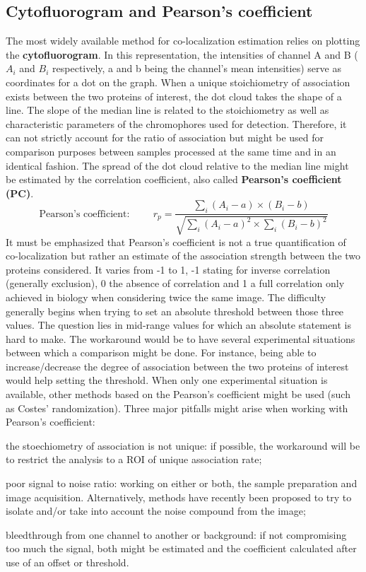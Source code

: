 \documentclass[]{spie}  %
\begin{document}
\subsection{Cytofluorogram and Pearson's coefficient}
\label{sec:MM_cyto}
The most widely available method for co-localization estimation relies on plotting the \textbf{cytofluorogram}. In this representation, the intensities of channel A and B ($A_i$ and $B_i$ respectively, a and b being the channel's mean intensities) serve as coordinates for a dot on the graph. When a unique stoichiometry of association exists between the two proteins of interest, the dot cloud takes the shape of a line. The slope of the median line is related to the stoichiometry as well as characteristic parameters of the chromophores used for detection. Therefore, it can not strictly account for the ratio of association but might be used for comparison purposes between samples processed at the same time and in an identical fashion. The spread of the dot cloud relative to the median line might be estimated by the correlation coefficient, also called \textbf{Pearson's coefficient (PC)}\cite{Manders1992}.
\begin{equation}
\mbox{Pearson's coefficient:} \hspace{1cm} r_p=\frac{\sum_{i}(A_i-a)\times(B_i-b)}{\sqrt{\sum_{i}(A_i-a)^2\times\sum_i(B_i-b)^2}}
\label{eqn:Pearson}
\end{equation}
It must be emphasized that Pearson's coefficient is not a true quantification of co-localization but rather an estimate of the association strength between the two proteins considered. It varies from -1 to 1, -1 stating for inverse correlation (generally exclusion), 0 the absence of correlation and 1 a full correlation only achieved in biology when considering twice the same image. The difficulty generally begins when trying to set an absolute threshold between those three values. The question lies in mid-range values for which an absolute statement is hard to make. The workaround would be to have several experimental situations between which a comparison might be done. For instance, being able to increase/decrease the degree of association between the two proteins of interest would help setting the threshold. When only one experimental situation is available, other methods based on the Pearson's coefficient might be used (such as Costes' randomization). Three major pitfalls might arise when working with Pearson's coefficient:
\begin{enumerate*} %
\item the stoechiometry of association is not unique: if possible, the workaround will be to restrict the analysis to a ROI of unique association rate;
\item poor signal to noise ratio: working on either or both, the sample preparation and image acquisition. Alternatively, methods have recently been proposed to try to isolate and/or take into account the noise compound from the image\cite{Adler2008};
\item bleedthrough from one channel to another or background: if not compromising too much the signal, both might be estimated and the coefficient calculated after use of an offset or threshold.
\end{enumerate*}
\end{document}
